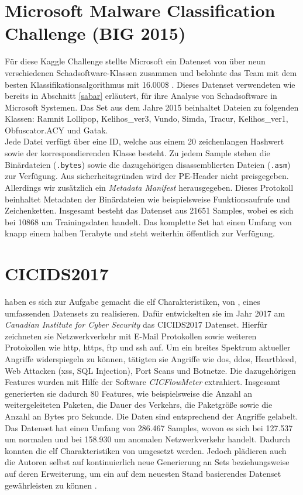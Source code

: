 \documentclass[
    12pt, %
    DIV10,
    ngerman, %
    a4paper, %
    oneside, %
    titlepage, %
    parskip=half, %
    headings=normal, %
    listof=totoc, %
    bibliography=totoc, %
    index=totoc, %
    captions=tableheading, %
    final %
]{scrreprt}
\begin{document}
\section{Microsoft Malware Classification Challenge (BIG 2015)}
Für diese Kaggle Challenge stellte Microsoft ein Datenset von über neun verschiedenen Schadsoftware-Klassen zusammen und belohnte das Team mit dem besten Klassifikationsalgorithmus mit 16.000\$ \parencite{Kaggle}. Dieses Datenset verwendeten wie bereits in Abschnitt \ref{sabar} erläutert, \textcite{Sabar2018} für ihre Analyse von Schadsoftware in Microsoft Systemen.
Das Set aus dem Jahre 2015 beinhaltet Dateien zu folgenden Klassen: Ramnit
Lollipop, Kelihos\_ver3, Vundo, Simda, Tracur, Kelihos\_ver1, Obfuscator.ACY und Gatak.\\Jede Datei verfügt über eine ID, welche aus einem 20 zeichenlangen Hashwert sowie der korrespondierenden Klasse besteht. Zu jedem Sample stehen die Binärdateien (\texttt{.bytes}) sowie die dazugehörigen disassemblierten Dateien (\texttt{.asm}) zur Verfügung. Aus sicherheitsgründen wird der PE-Header nicht preisgegeben. Allerdings wir zusätzlich ein \emph{Metadata Manifest} herausgegeben. Dieses Protokoll beinhaltet Metadaten der Binärdateien wie beispielsweise Funktionsaufrufe und Zeichenketten.
Insgesamt besteht das Datenset aus 21651 Samples, wobei es sich bei 10868 um Trainingsdaten handelt. Das komplette Set hat einen Umfang von knapp einem halben Terabyte und steht weiterhin öffentlich zur Verfügung.
\section{CICIDS2017}
\textcite{Sharafaldin2018} haben es sich zur Aufgabe gemacht die elf Charakteristiken, von \textcite{7885840}, eines umfassenden Datensets zu realisieren. Dafür entwickelten sie im Jahr 2017 am \emph{Canadian Institute for Cyber Security} das CICIDS2017 Datenset. Hierfür zeichneten sie Netzwerkverkehr mit E-Mail Protokollen sowie weiteren Protokollen wie \ac{http}, \ac{https}, \ac{ftp} und \ac{ssh} auf. Um ein breites Spektrum aktueller Angriffe widerspiegeln zu können, tätigten sie Angriffe wie \ac{dos}, \ac{ddos}, Heartbleed, Web Attacken (\ac{xss}, SQL Injection), Port Scans und Botnetze. Die dazugehörigen Features wurden mit Hilfe der Software \emph{CICFlowMeter} \parencite{Lashkari201} extrahiert. Insgesamt generierten sie dadurch 80 Features, wie beispielsweise die Anzahl an weitergeleiteten Paketen, die Dauer des Verkehrs, die Paketgrö{\ss}e sowie die Anzahl an Bytes pro Sekunde.
Die Daten sind entsprechend der Angriffe gelabelt. Das Datenset hat einen Umfang von 286.467 Samples, wovon es sich bei 127.537 um normalen und bei 158.930 um anomalen Netzwerkverkehr handelt. Dadurch konnten die elf Charakteristiken von \textcite{7885840} umgesetzt werden. Jedoch plädieren auch die Autoren selbst auf kontinuierlich neue Generierung an Sets beziehungsweise auf deren Erweiterung, um ein auf dem neuesten Stand basierendes Datenset gewährleisten zu können \parencite{Sharafaldin2018}.
\end{document}
